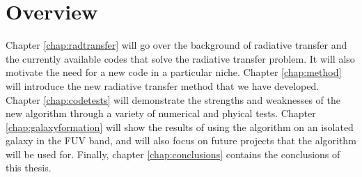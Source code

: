 

%
%
%
%
% 
%
%
% 
%





\section{Overview}

Chapter \ref{chap:radtransfer} will go over the background of radiative transfer and the currently available codes that solve the radiative transfer problem. It will also motivate the need for a new code in a particular niche. Chapter \ref{chap:method} will introduce the new radiative transfer method that we have developed. Chapter \ref{chap:codetests} will demonstrate the strengths and weaknesses of the new algorithm through a variety of numerical and phyical tests. Chapter \ref{chap:galaxyformation} will show the results of using the algorithm on an isolated galaxy in the FUV band, and will also focus on future projects that the algorithm will be used for. Finally, chapter \ref{chap:conclusions} contains the conclusions of this thesis.
